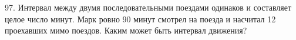 97. Интервал между двумя последовательными поездами одинаков и составляет целое число минут. Марк ровно 90 минут смотрел на поезда и насчитал 12 проехавших мимо поездов. Каким может быть интервал движения?\\
